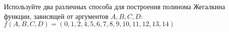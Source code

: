 \question Используйте два различных способа для построения полинома Жегалкина функции, зависящей от аргументов $A, B, C, D$:
$f(A,B,C,D) = (0,1,2,4,5,6,7,8,9,10,11,12,13,14)$